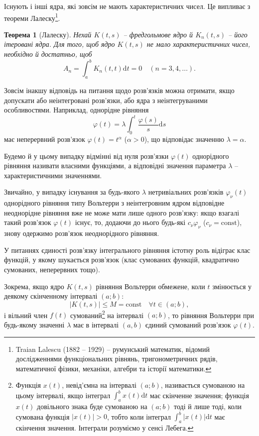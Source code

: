 \documentclass[14pt,twoside]{extreport}
\theoremstyle{mystyle}
\newtheorem{thm}{Теорема}
\numberwithin{equation}{chapter}
\begin{document}
Існують і інші ядра, які зовсім не мають характеристичних чисел. Це випливає з теореми Лалеску\footnote{Traian Lalescu (1882 -- 1929) -- румунський математик, відомий дослідженнями функціональних рівнянь, тригонометричних рядів, математичної фізики, механіки, алгебри та історії математики.}.

\begin{thm}[Лалеску]
	Нехай $K(t, s)$ -- фредгольмове ядро й $K_n(t, s)$ -- його ітеровані ядра. Для того, щоб ядро $K(t, s)$ не мало характеристичних чисел, необхідно й достатньо, щоб
	\[
	A_n = \int_{a}^{b} K_n(t, t) \mathrm{d}t = 0 \quad (n=3, 4, \ldots).
	\]
\end{thm}

Зовсім інакшу відповідь на питання щодо розв'язків можна отримати, якщо допускати або неінтегровані розв'язки, або ядра з неінтегруваними особливостями. Наприклад, однорідне рівняння
\[
\varphi(t) = \lambda \int_{0}^{t} \frac{\varphi(s)}{s} \mathrm{d}s
\]
має неперервний розв'язок $\varphi(t) = t^\alpha$ ($\alpha > 0$), що відповідає значенню $\lambda = \alpha$.

Будемо й у цьому випадку відмінні від нуля розв'язки $\varphi(t)$ однорідного рівняння називати власними функціями, а відповідні значення параметра $\lambda$ -- характеристичними значеннями.

Звичайно, у випадку існування за будь-якого $\lambda$ нетривіальних розв'язків $\varphi_{\nu}(t)$ однорідного рівняння типу Вольтерри з неінтегровним ядром відповідне неоднорідне рівняння вже не може мати лише одного розв'язку: якщо взагалі такий розв'язок $\varphi(t)$ існує, то, додаючи до нього будь-які $c_{\nu}\varphi_{\nu}$ ($c_{\nu} = \textrm{const}$), знову одержимо розв'язок неоднорідного рівняння.

У питаннях єдиності розв'язку інтегрального рівняння істотну роль відіграє клас функцій, у якому шукається розв'язок (клас сумованих функцій, квадратично сумованих, неперервних тощо).

Зокрема, якщо ядро $K(t, s)$ рівняння Вольтерри обмежене, коли $t$ змінюється у деякому скінченному інтервалі $(a; b)$:
\[
|K(t, s)| \leqslant M = \textrm{const} \quad \forall t \in (a; b),
\]
і вільний член $f(t)$ сумований\footnote{Функція $x(t)$, невід'ємна на інтервалі $(a; b)$, називається сумованою на цьому інтервалі, якщо інтеграл $\int_{a}^{b} x(t) \mathrm{d}t$ має скінченне значення; функція $x(t)$ довільного знака буде сумованою на $(a; b)$ тоді й лише тоді, коли сумована функція $|x(t)|>0$, тобто коли інтеграл $\int_{a}^{b} |x(t)| \mathrm{d}t$ має скінчення значення. Інтеграли розуміємо у сенсі Лебега.} на інтервалі $(a; b)$, то рівняння Вольтерри при будь-якому значенні $\lambda$ має в інтервалі $(a, b)$ єдиний сумований розв'язок $\varphi(t)$.
\end{document}
